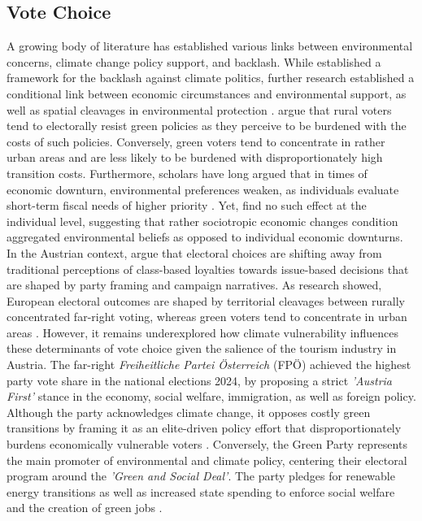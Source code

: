 \documentclass{article}
\begin{document}
\subsection{Vote Choice}
A growing body of literature has established various links between environmental concerns, climate change policy support, and backlash. While \textcite{patterson2023} established a framework for the backlash against climate politics, further research established a conditional link between economic circumstances and environmental support, as well as spatial cleavages in environmental protection \parencite{Mildenberger2017, Halikiopoulou_Vrakopoulos_Arndt_2026, Arndt2023}. \textcite{Halikiopoulou_Vrakopoulos_Arndt_2026} argue that rural voters tend to electorally resist green policies as they perceive to be burdened with the costs of such policies. Conversely, green voters tend to concentrate in rather urban areas and are less likely to be burdened with disproportionately high transition costs. Furthermore, scholars have long argued that in times of economic downturn, environmental preferences weaken, as individuals evaluate short-term fiscal needs of higher priority \parencite{Shum2012}. Yet, \textcite{Mildenberger2017} find no such effect at the individual level, suggesting that rather sociotropic economic changes condition aggregated environmental beliefs as opposed to individual economic downturns. 
In the Austrian context, \textcite{kritzinger2013} argue that electoral choices are shifting away from traditional perceptions of class-based loyalties towards issue-based decisions that are shaped by party framing and campaign narratives. As research showed, European electoral outcomes are shaped by territorial cleavages between rurally concentrated far-right voting, whereas green voters tend to concentrate in urban areas \parencite{Arndt2023, DeVries2018, Halikiopoulou_Vrakopoulos_Arndt_2026}. 
However, it remains underexplored how climate vulnerability influences these determinants of vote choice given the salience of the tourism industry in Austria. 
The far-right \textit{Freiheitliche Partei Österreich} (FPÖ) achieved the highest party vote share in the national elections 2024, by proposing a strict \textit{'Austria First'} stance in the economy, social welfare, immigration, as well as foreign policy. Although the party acknowledges climate change, it opposes costly green transitions by framing it as an elite-driven policy effort that disproportionately burdens economically vulnerable voters \parencite{fpoe2024}. 
Conversely, the Green Party represents the main promoter of environmental and climate policy, centering their electoral program around the \textit{'Green and Social Deal'}. The party pledges for renewable energy transitions as well as increased state spending to enforce social welfare and the creation of green jobs \parencite{gruene2024}.
\end{document}
